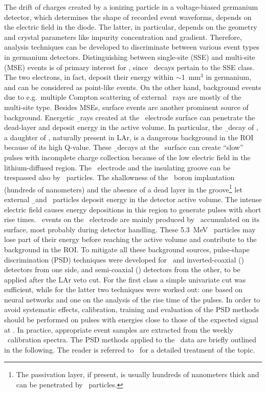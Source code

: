 The drift of charges created by a ionizing particle in a voltage-biased germanium
detector, which determines the shape of recorded event waveforms, depends on the electric
field in the diode. The latter, in particular, depends on the geometry and crystal
parameters like impurity concentration and gradient. Therefore, analysis
techniques can be developed to discriminate between various event types in germanium
detectors. Distinguishing between single-site (SSE) and multi-site (MSE) events is of
primary interest for \gerda, since \onbb\ decays pertain to the SSE class. The two
electrons, in fact, deposit their energy within $\sim$1~mm$^3$ in germanium, and can be
considered as point-like events. On the other hand, background events due to
e.g.~multiple Compton scattering of external \g\ rays are mostly of the multi-site type.
Besides MSEs, surface events are another prominent source of background. Energetic \b\
rays created at the \nplus\ electrode surface can penetrate the dead-layer and deposit
energy in the active volume. In particular, the \b\ decay of \kvz, a daughter of \Arh,
naturally present in LAr, is a dangerous background in the ROI because of its high
Q-value. These \b\ decays at the \nplus\ surface can create ``slow'' pulses with incomplete
charge collection because of the low electric field in the lithium-diffused region. The \pplus\
electrode and the insulating groove can be trespassed also by \a\ particles. The
shallowness of the \pplus\ boron implantation (hundreds of nanometers) and the
absence of a dead layer in the groove\footnote{%
  The passivation layer, if present, is usually hundreds of nanometers thick and can be
  penetrated by \a\ particles.
} let external \b{}nd \a\ particles deposit energy in the detector active volume. The intense
electric field causes energy depositions in this region to generate pulses with short rise
times. \a\ events on the \pplus\ electrode are mainly produced by \Po\ accumulated on its
surface, most probably during detector handling. These 5.3~MeV \a\ particles may lose part
of their energy before reaching the active volume and contribute to the background in the
ROI.
\newpar
To mitigate all these background sources, pulse-shape discrimination (PSD) techniques were
developed for \bege\ and inverted-coaxial (\icoax) detectors from one side, and
semi-coaxial (\scoax) detectors from the other, to be applied after the LAr veto cut. For
the first class a simple univariate cut was sufficient, while for the latter two
techniques were worked out: one based on neural networks and one on the analysis of the
rise time of the pulses.  In order to avoid systematic effects, calibration, training and
evaluation of the PSD methods should be performed on pulses with energies close to those
of the expected signal at \qbb.  In practice, appropriate event samples are extracted from
the weekly \Th\ calibration spectra.  The PSD methods applied to the \gerda\ data are
briefly outlined in the following. The reader is referred to~\cite{Agostini2021a} for a
detailed treatment of the topic.

